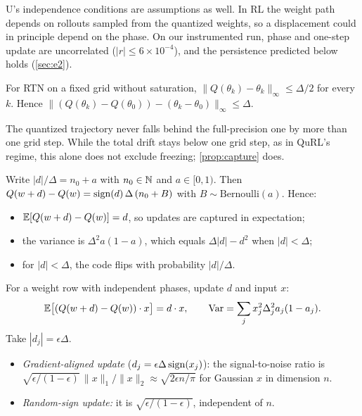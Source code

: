 U's independence conditions are assumptions as well. In RL the weight path depends on rollouts sampled from the quantized weights, so a displacement could in principle depend on the phase. On our instrumented run, phase and one-step update are uncorrelated ($|r|\le6\times10^{-4}$), and the persistence predicted below holds (\cref{sec:e2}).

\begin{proposition}\label{prop:lag}
For RTN on a fixed grid without saturation, $\|Q(\theta_k)-\theta_k\|_\infty\le\Delta/2$ for every $k$. Hence $\|(Q(\theta_k)-Q(\theta_0))-(\theta_k-\theta_0)\|_\infty\le\Delta$.

The quantized trajectory never falls behind the full-precision one by more than one grid step. While the total drift stays below one grid step, as in QuRL's regime, this alone does not exclude freezing; \cref{prop:capture} does.
\end{proposition}

\begin{proposition}\label{prop:capture}
Write $|d|/\Delta=n_0+a$ with $n_0\in\mathbb{N}$ and $a\in[0,1)$. Then $Q(w+d)-Q(w)=\operatorname{sign}(d)\,\Delta\,(n_0+B)$ with $B\sim\mathrm{Bernoulli}(a)$. Hence:
\begin{itemize}[leftmargin=*,itemsep=1pt]
\item $\mathbb{E}[Q(w+d)-Q(w)]=d$, so updates are captured in expectation;
\item the variance is $\Delta^2a(1-a)$, which equals $\Delta|d|-d^2$ when $|d|<\Delta$;
\item for $|d|<\Delta$, the code flips with probability $|d|/\Delta$.
\end{itemize}
\end{proposition}

\begin{proposition}\label{prop:layer}
For a weight row with independent phases, update $d$ and input $x$:
\[
\mathbb{E}\bigl[(Q(w+d)-Q(w))\cdot x\bigr]=d\cdot x,\qquad \operatorname{Var}=\sum_jx_j^2\Delta_j^2a_j(1-a_j).
\]
Take $|d_j|=\epsilon\Delta$.
\begin{itemize}[leftmargin=*,itemsep=1pt]
\item \emph{Gradient-aligned update} ($d_j=\epsilon\Delta\operatorname{sign}(x_j)$): the signal-to-noise ratio is $\sqrt{\epsilon/(1-\epsilon)}\,\|x\|_1/\|x\|_2\approx\sqrt{2\epsilon n/\pi}$ for Gaussian $x$ in dimension $n$.
\item \emph{Random-sign update:} it is $\sqrt{\epsilon/(1-\epsilon)}$, independent of $n$.
\end{itemize}
\end{proposition}


